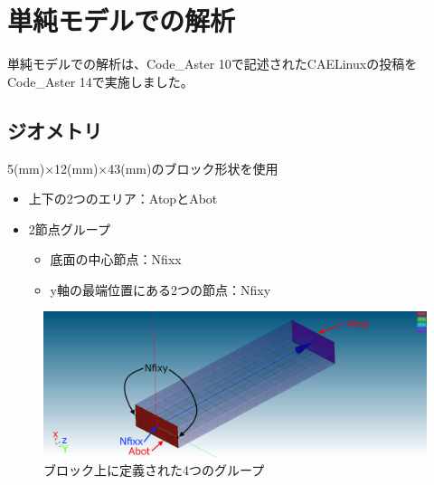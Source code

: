 \section{単純モデルでの解析}
単純モデルでの解析は、Code\_Aster 10で記述されたCAELinuxの投稿をCode\_Aster 14で実施しました。
\vspace{-\baselineskip}
\subsection{ジオメトリ}
5(mm)×12(mm)×43(mm)のブロック形状を使用
\begin{itemize}
	\item 上下の2つのエリア：AtopとAbot
	\item 2節点グループ
	      \begin{itemize}
		      \item 底面の中心節点：Nfixx
		      \item y軸の最端位置にある2つの節点：Nfixy
	      \end{itemize}
\end{itemize}
\vspace{-\baselineskip}
\begin{figure}[htbp]
	\caption{ブロック上に定義された4つのグループ}
	\centering
	\includegraphics[width=0.7\columnwidth]{fig/bc.png}
\end{figure}
\clearpage
